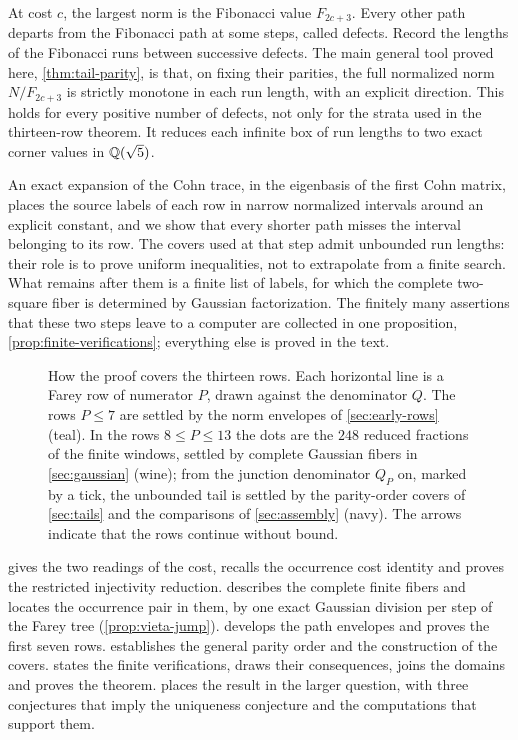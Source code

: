 At cost $c$, the largest norm is the Fibonacci value $F_{2c+3}$.
Every other path departs from the Fibonacci path at some steps, called
defects. Record the lengths of the Fibonacci runs between successive
defects. The main general tool proved here, \cref{thm:tail-parity}, is
that, on fixing their parities, the full normalized norm $N/F_{2c+3}$ is
strictly monotone in each run length, with an explicit direction. This
holds for every positive number of defects, not only for the strata used
in the thirteen-row theorem. It reduces each infinite box of run lengths to
two exact corner values in $\mathbb{Q}(\sqrt5)$.

An exact expansion of the Cohn trace, in the eigenbasis of the first Cohn
matrix, places the source labels of each row in narrow normalized
intervals around an explicit constant, and we show that every shorter path
misses the interval belonging to its row. The covers used at that step admit unbounded run
lengths: their role is to prove uniform inequalities, not to extrapolate
from a finite search. What remains after them is a finite list of labels,
for which the complete two-square fiber is determined by Gaussian
factorization. The finitely many assertions that these two steps leave to
a computer are collected in one proposition, \cref{prop:finite-verifications};
everything else is proved in the text.

\begin{figure}[tb]
\centering

\caption{How the proof covers the thirteen rows. Each horizontal line is a
Farey row of numerator $P$, drawn against the denominator $Q$. The rows
$P\leqslant7$ are settled by the norm envelopes of \cref{sec:early-rows}
(teal). In the rows $8\leqslant P\leqslant13$ the dots are the $248$ reduced
fractions of the finite windows, settled by complete Gaussian fibers in
\cref{sec:gaussian} (wine); from the junction denominator $Q_P$ on, marked by
a tick, the unbounded tail is settled by the parity-order covers of
\cref{sec:tails} and the comparisons of \cref{sec:assembly} (navy). The arrows
indicate that the rows continue without bound.}
\label{fig:proof-map}
\end{figure}

 gives the two readings of the cost, recalls the
occurrence cost identity and proves the restricted injectivity reduction.
 describes the complete finite fibers and locates the
occurrence pair in them, by one exact Gaussian division per step of the
Farey tree (\cref{prop:vieta-jump}).
 develops the path envelopes and proves the
first seven rows.  establishes the
general parity order and the construction of the covers.
 states the finite verifications, draws their
consequences, joins the domains and proves the theorem. 
places the result in the larger question, with three conjectures that imply
the uniqueness conjecture and the computations that support them.


